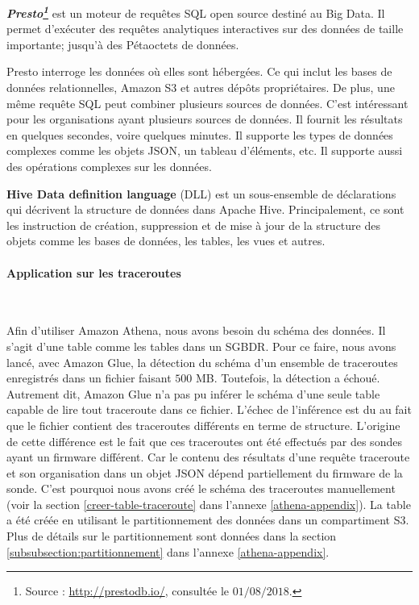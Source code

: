\begin{tcolorbox}
	\textbf{\textit{Presto\footnote{Source : \url{http://prestodb.io/}, consultée le $01/08/2018$.} }} est un moteur de requêtes SQL open source destiné au Big Data. Il permet d'exécuter des requêtes analytiques interactives sur des données de taille importante; jusqu'à des Pétaoctets de données.
	
	Presto interroge les données où elles sont hébergées. Ce qui inclut les bases de données relationnelles, Amazon S3 et autres dépôts propriétaires. De plus, une même requête SQL peut combiner plusieurs sources de données. C'est intéressant pour les organisations ayant plusieurs sources de données. Il fournit les résultats en quelques secondes, voire quelques minutes.  Il supporte les types de données complexes comme les objets JSON, un tableau d'éléments, etc. Il supporte aussi  des opérations complexes sur les données.
\end{tcolorbox} 


\begin{tcolorbox}
	\textbf{Hive Data definition language} (DLL) est un sous-ensemble de déclarations qui décrivent la structure de données dans Apache Hive.  Principalement, ce sont les instruction de création, suppression et de mise à jour de la structure des objets comme les bases de données, les tables, les vues et autres.
\end{tcolorbox}

\paragraph{Application sur les traceroutes}~

Afin d'utiliser Amazon Athena, nous avons besoin du schéma des données. Il s'agit d'une table comme les tables dans un SGBDR. Pour ce faire, 
nous avons lancé, avec Amazon Glue,  la détection du schéma d'un ensemble de  traceroutes enregistrés dans un fichier faisant $500$ MB. Toutefois, la détection a échoué. Autrement dit, Amazon Glue n'a pas pu inférer le schéma d'une seule table capable de lire tout traceroute dans ce fichier.  L'échec de l'inférence est du au fait que le fichier contient des traceroutes différents en terme de structure. L'origine de cette différence  est le fait que ces traceroutes ont été effectués par des sondes ayant un firmware différent. Car le contenu des résultats d'une requête traceroute  et son organisation dans un objet JSON dépend partiellement du firmware de la sonde. C'est pourquoi nous avons créé le schéma des traceroutes manuellement (voir la section \ref{creer-table-traceroute} dans l'annexe \ref{athena-appendix}). La table a été créée en utilisant le partitionnement des données dans un compartiment S3. Plus de détails sur le partitionnement sont données dans la section \ref{subsubsection:partitionnement} dans l'annexe \ref{athena-appendix}.



